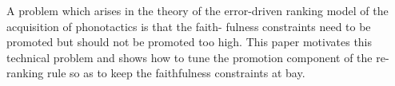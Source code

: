A problem which arises in the theory of the error-driven ranking model of the acquisition of phonotactics is that the faith- fulness constraints need to be promoted but should not be promoted too high. This paper motivates this technical problem and shows how to tune the promotion component of the re-ranking rule so as to keep the faithfulness constraints at bay.
